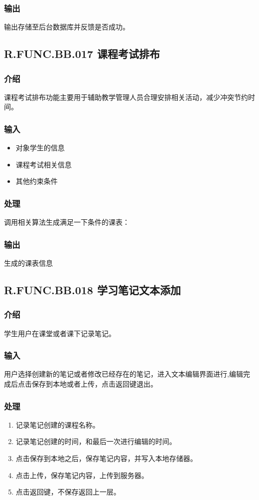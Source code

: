     \subsubsection{输出}
    输出存储至后台数据库并反馈是否成功。

  \subsection{R.FUNC.BB.017 课程考试排布}
    \subsubsection{介绍}
    课程考试排布功能主要用于辅助教学管理人员合理安排相关活动，减少冲突节约时间。
    \subsubsection{输入}
    \begin{itemize}
      \item 对象学生的信息
      \item 课程考试相关信息
      \item 其他约束条件
    \end{itemize}
    \subsubsection{处理}
    调用相关算法生成满足一下条件的课表：
    \subsubsection{输出}
    生成的课表信息


 \subsection{R.FUNC.BB.018 学习笔记文本添加}
    \subsubsection{介绍}
    学生用户在课堂或者课下记录笔记。
    \subsubsection{输入}
    用户选择创建新的笔记或者修改已经存在的笔记，进入文本编辑界面进行,编辑完成后点击保存到本地或者上传，点击返回键退出。
    \subsubsection{处理}
    \begin{enumerate}
      \item 记录笔记创建的课程名称。
      \item 记录笔记创建的时间，和最后一次进行编辑的时间。
      \item 点击保存到本地之后，保存笔记内容，并写入本地存储器。
      \item 点击上传，保存笔记内容，上传到服务器。
      \item 点击返回键，不保存返回上一层。
    \end{enumerate}
